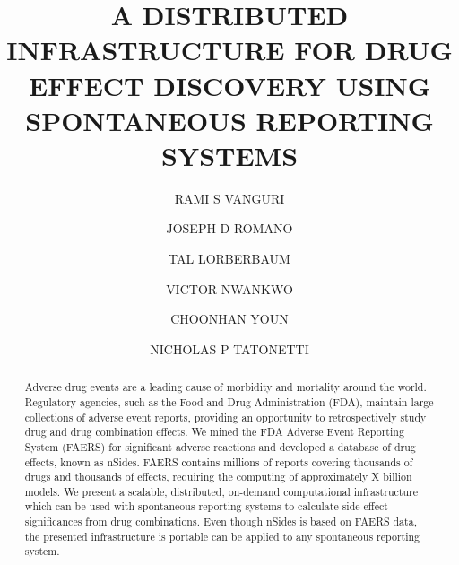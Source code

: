 \documentclass{ws-procs11x85}
\begin{document}
\title{A DISTRIBUTED INFRASTRUCTURE FOR DRUG EFFECT DISCOVERY USING SPONTANEOUS REPORTING SYSTEMS}

\author{RAMI S VANGURI}

\address{Department of Biomedical Informatics, Columbia University,\\
New York, NY 10032 USA\\
E-mail: r.vanguri@columbia.edu}

\author{JOSEPH D ROMANO}

\address{Department of Biomedical Informatics, Columbia University,\\
New York, NY 10032 USA\\
E-mail: jdr2160@columbia.edu}

\author{TAL LORBERBAUM}

\address{Department of Biomedical Informatics, Columbia University,\\
New York, NY 10032 USA\\
E-mail: tal.lorberbaum@columbia.edu}

\author{VICTOR NWANKWO}

\address{Department of Biomedical Informatics, Columbia University,\\
New York, NY 10032 USA\\
E-mail: vtn2106@columbia.edu}

\author{CHOONHAN YOUN}

\address{San Diego Supercomputer Center, University of California, San Diego,\\
La Jolla, CA 92093 USA\\
E-mail: cyoun@sdsc.edu}

\author{NICHOLAS P TATONETTI}

\address{Department of Biomedical Informatics, Columbia University,\\
New York, NY 10032 USA\\
E-mail: nick.tatonetti@columbia.edu}

\begin{abstract}
Adverse drug events are a leading cause of morbidity and mortality
around the world. Regulatory agencies, such as the Food and Drug
Administration (FDA), maintain large collections of adverse event
reports, providing an opportunity to retrospectively study drug and
drug combination effects.  We mined the FDA Adverse Event Reporting
System (FAERS) for significant adverse reactions and developed a
database of drug effects, known as nSides. FAERS contains millions of
reports covering thousands of drugs and thousands of effects,
requiring the computing of approximately X billion models. We present
a scalable, distributed, on-demand computational infrastructure which
can be used with spontaneous reporting systems to calculate side
effect significances from drug combinations. Even though nSides is
based on FAERS data, the presented infrastructure is portable can be
applied to any spontaneous reporting system.
\end{abstract}
\end{document}
